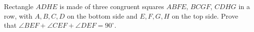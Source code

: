 Rectangle $ADHE$ is made of three congruent squares $ABFE$, $BCGF$, $CDHG$ in a row, with $A,B,C,D$ on the bottom side and $E,F,G,H$ on the top side. Prove that $\angle BEF+\angle CEF+\angle DEF=90^\circ$.
